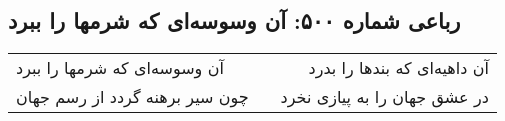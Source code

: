 \begin{center}
\section*{رباعی شماره ۵۰۰: آن وسوسه‌ای که شرمها را ببرد}
\label{sec:0500}
\begin{longtable}{l p{0.5cm} r}
آن وسوسه‌ای که شرمها را ببرد
&&
آن داهیه‌ای که بندها را بدرد
\\
چون سیر برهنه گردد از رسم جهان
&&
در عشق جهان را به پیازی نخرد
\\
\end{longtable}
\end{center}
